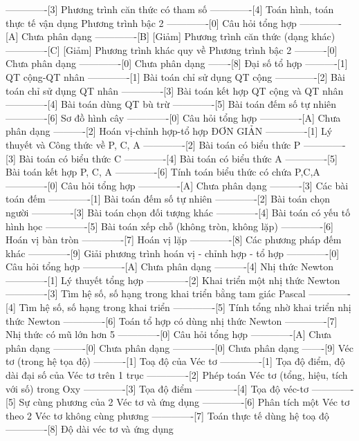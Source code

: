 -------------[3] Phương trình căn thức có tham số
-------------[4] Toán hình, toán thực tế vận dụng Phương trình bậc 2
-------------[0] Câu hỏi tổng hợp
-------------[A] Chưa phân dạng
-------------[B] [Giảm] Phương trình căn thức (dạng khác)
-------------[C] [Giảm] Phương trình khác quy về Phương trình bậc 2
----------[0] Chưa phân dạng
-------------[0] Chưa phân dạng
-------[8] Đại số tổ hợp
----------[1] QT cộng-QT nhân
-------------[1] Bài toán chỉ sử dụng QT cộng
-------------[2] Bài toán chỉ sử dụng QT nhân
-------------[3] Bài toán kết hợp QT cộng và QT nhân
-------------[4] Bài toán dùng QT bù trừ
-------------[5] Bài toán đếm số tự nhiên
-------------[6] Sơ đồ hình cây
-------------[0] Câu hỏi tổng hợp
-------------[A] Chưa phân dạng
----------[2] Hoán vị-chỉnh hợp-tổ hợp ĐƠN GIẢN
-------------[1] Lý thuyết và Công thức về P, C, A
-------------[2] Bài toán có biểu thức P
-------------[3] Bài toán có biểu thức C
-------------[4] Bài toán có biểu thức A
-------------[5] Bài toán kết hợp P, C, A
-------------[6] Tính toán biểu thức có chứa P,C,A
-------------[0] Câu hỏi tổng hợp
-------------[A] Chưa phân dạng
----------[3] Các bài toán đếm 
-------------[1] Bài toán đếm số tự nhiên
-------------[2] Bài toán chọn người
-------------[3] Bài toán chọn đối tượng khác
-------------[4] Bài toán có yếu tố hình học
-------------[5] Bài toán xếp chỗ (không tròn, không lặp)
-------------[6] Hoán vị bàn tròn
-------------[7] Hoán vị lặp
-------------[8] Các phương pháp đếm khác
-------------[9] Giải phương trình hoán vị - chỉnh hợp -  tổ hợp
-------------[0] Câu hỏi tổng hợp
-------------[A] Chưa phân dạng
----------[4] Nhị thức Newton
-------------[1] Lý thuyết tổng hợp 
-------------[2] Khai triển một nhị thức Newton
-------------[3] Tìm hệ số, số hạng trong khai triển bằng tam giác Pascal
-------------[4] Tìm hệ số, số hạng trong khai triển
-------------[5] Tính tổng nhờ khai triển nhị thức Newton
-------------[6] Toán tổ hợp có dùng nhị thức Newton
-------------[7] Nhị thức có mũ lớn hơn 5
-------------[0] Câu hỏi tổng hợp
-------------[A] Chưa phân dạng
----------[0] Chưa phân dạng
-------------[0] Chưa phân dạng
-------[9] Véc tơ (trong hệ tọa độ)
----------[1] Toạ độ của Véc tơ
-------------[1] Tọa độ điểm, độ dài đại số của Véc tơ trên 1 trục
-------------[2] Phép toán Véc tơ (tổng, hiệu, tích với số) trong Oxy
-------------[3] Tọa độ điểm 
-------------[4] Tọa độ véc-tơ
-------------[5] Sự cùng phương của 2 Véc tơ và ứng dụng
-------------[6] Phân tích một Véc tơ theo 2 Véc tơ không cùng phương
-------------[7] Toán thực tế dùng hệ toạ độ
-------------[8] Độ dài véc tơ và ứng dụng
